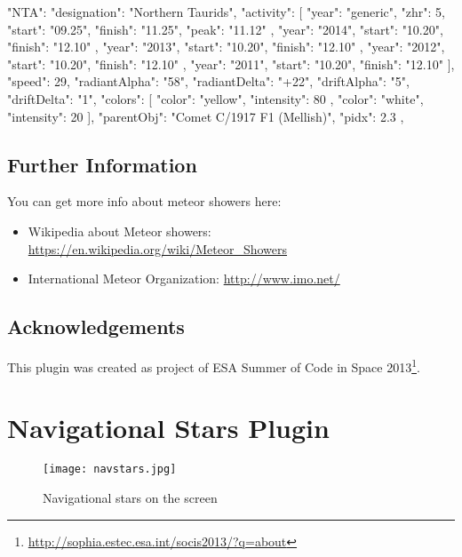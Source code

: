 \begin{configfile}
"NTA":
	{
		"designation": "Northern Taurids",
		"activity":
		[
		{
			"year": "generic",
			"zhr": 5,
			"start": "09.25",
			"finish": "11.25",
			"peak": "11.12"
		},
		{
			"year": "2014",
			"start": "10.20",
			"finish": "12.10"
		},
		{
			"year": "2013",
			"start": "10.20",
			"finish": "12.10"
		},
		{
			"year": "2012",
			"start": "10.20",
			"finish": "12.10"
		},
		{
			"year": "2011",
			"start": "10.20",
			"finish": "12.10"
		}
		],
		"speed": 29,
		"radiantAlpha": "58",
		"radiantDelta": "+22",
		"driftAlpha": "5",
		"driftDelta": "1",
		"colors":
		[
		{
			"color": "yellow",
			"intensity": 80
		},
		{
			"color": "white",
			"intensity": 20
		}
		],
		"parentObj": "Comet C/1917 F1 (Mellish)",
		"pidx": 2.3
	},
\end{configfile}

\subsection{Further Information}
\label{sec:plugins:MeteorShowers:Further}

You can get more info about meteor showers here:
\begin{itemize}
\item Wikipedia about Meteor showers: \url{https://en.wikipedia.org/wiki/Meteor_Showers}
\item International Meteor Organization: \url{http://www.imo.net/}
\end{itemize}

\subsection*{Acknowledgements}
This plugin was created as project of ESA Summer of Code in Space 2013\footnote{\url{http://sophia.estec.esa.int/socis2013/?q=about}}.


\newpage

\section{Navigational Stars Plugin}
\label{sec:plugins:NavigationalStars}

\begin{figure}[ht]
\texttt{[image: navstars.jpg]}
\caption{Navigational stars on the screen}
\label{fig:plugin:NavigationalStars}
\end{figure}

